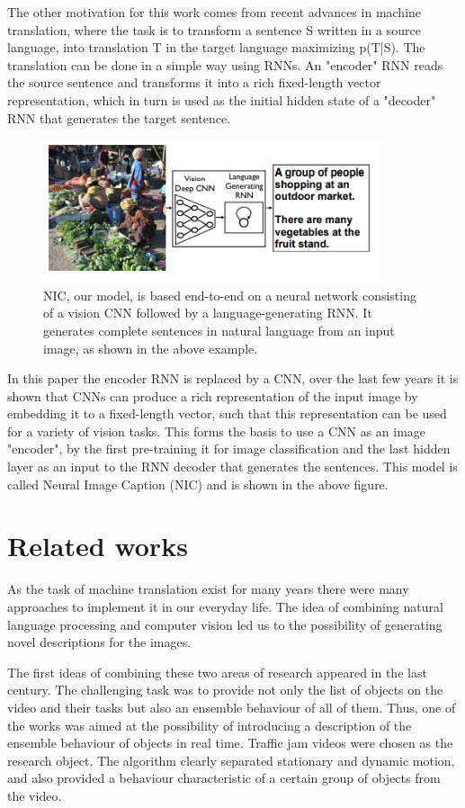 \documentclass[a4paper,UKenglish,cleveref, autoref, thm-restate]{lipics-v2021}
\begin{document}
The other motivation for this work comes from recent advances in machine translation, where the task is to transform a sentence S written in a source language, into translation T in the target language maximizing p(T|S).
The translation can be done in a simple way using RNNs. An "encoder" RNN reads the source sentence and transforms it into a rich fixed-length vector representation, which in turn is used as the initial hidden state of a "decoder" RNN that generates the target sentence.
\begin{figure}[ht]
    \centering
    \includegraphics[width=10cm]{images/NIC_Basic_Model.png}
    \caption{NIC, our model, is based end-to-end on a neural network consisting of a vision CNN followed by a language-generating RNN. It generates complete sentences in natural language from an input image, as shown in the above example.}
    \label{fig:}
\end{figure}

In this paper the encoder RNN is replaced by a CNN, over the last few years it is shown that CNNs can produce a rich representation of the input image by embedding it to a fixed-length vector, such that this representation can be used for a variety of vision tasks. This forms the basis to use a CNN as an image "encoder", by the first pre-training it for image classification and the last hidden layer as an input to the RNN decoder that generates the sentences. This model is called Neural Image Caption (NIC) and is shown in the above figure.

\section{Related works}
\label{related works}
As the task of machine translation exist for many years there were many approaches to implement it in our everyday life. The idea of combining natural language processing and computer vision led us to the possibility of generating novel descriptions for the images.

The first ideas of combining these two areas of research appeared in the last century. The challenging task was to provide not only the list of objects on the video and their tasks but also an ensemble behaviour of all of them.  Thus, one of the works was aimed at the possibility of introducing a description of the ensemble behaviour of objects in real time. Traffic jam videos were chosen as the research object. The algorithm clearly separated stationary and dynamic motion, and also provided a behaviour characteristic of a certain group of objects from the video.
\end{document}
